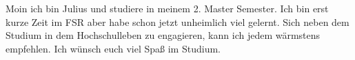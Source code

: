 \begin{multicols}{2}
{
Moin ich bin Julius und studiere in meinem 2. Master Semester. Ich bin erst kurze Zeit im FSR aber habe schon jetzt unheimlich viel gelernt. Sich neben dem Studium in dem Hochschulleben zu engagieren, kann ich jedem wärmstens empfehlen. Ich wünsch euch viel Spaß im Studium.
}



\end{multicols}

